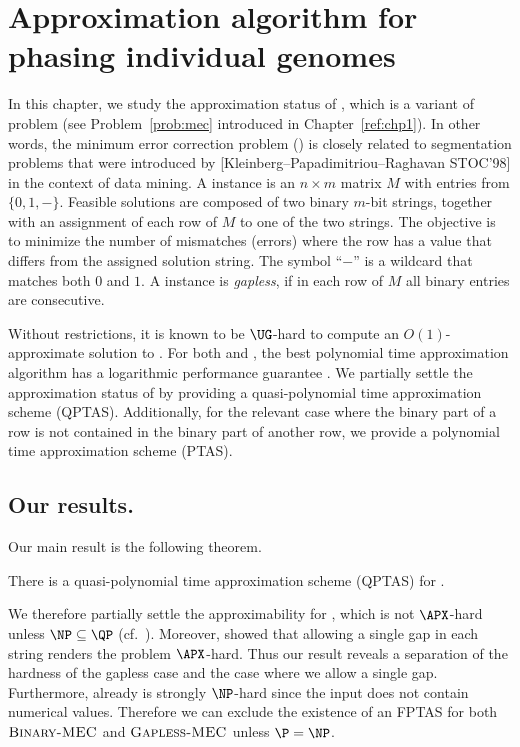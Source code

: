 \chapter{Approximation algorithm for phasing individual genomes}\label{ref:chp3}

In this chapter, we study the approximation status of \GMEC, which is a variant of \MEC problem (see Problem~\ref{prob:mec} introduced in Chapter~\ref{ref:chp1}).
In other words, the minimum error correction problem (\MEC) is closely related to segmentation problems that were introduced by {[}Kleinberg--Papadimitriou--Raghavan STOC'98{]} in the context of data mining.
A \MEC instance is an $n \times m$ matrix $M$ with entries from $\{0,1,-\}$. 
    Feasible solutions are composed of two binary $m$-bit strings, together with an assignment of each row of $M$ to one of the two strings.
    The objective is to minimize the number of mismatches (errors) where the row has a value that differs from the assigned solution string.
    The symbol ``$-$'' is a wildcard that matches both $0$ and $1$.
    A \MEC instance is \textit{gapless}, if in each row of $M$ all binary entries are consecutive.

     Without restrictions, it is known to be $\UG$-hard \citep{trevisan2012khot} to compute an $O(1)$-approximate solution to \MEC. 
     For both \MEC and \GMEC, the best polynomial time approximation algorithm has a logarithmic performance guarantee \citep{BDK+16_minimum}.
    We partially settle the approximation status of \GMEC by providing a quasi-polynomial time approximation scheme (QPTAS).
    Additionally, for the relevant case where the binary part of a row is not contained in the binary part of another row, we provide a polynomial time approximation scheme (PTAS).
    

\section{Our results.}
Our main result is the following theorem.
\begin{theorem}\label{thm:qptas}
    There is a quasi-polynomial time approximation scheme (QPTAS) for \GMEC.
\end{theorem}
We therefore partially settle the approximability for \GMEC, which is not $\APX$-hard unless $\NP \subseteq \QP$ (cf.~\cite{RS09_approximation}).
Moreover, \cite{Cilibrasi2007} showed that allowing a single gap in each string renders the problem $\APX$-hard.
Thus our result reveals a separation of the hardness of the gapless case and the case where we allow a single gap.
Furthermore, already \BMEC is strongly $\NP$-hard since the input does not contain numerical values. 
Therefore we can exclude the existence of an FPTAS for both $\textsc{Binary-MEC}$ and $\textsc{Gapless-MEC}$ unless $\P = \NP$.

